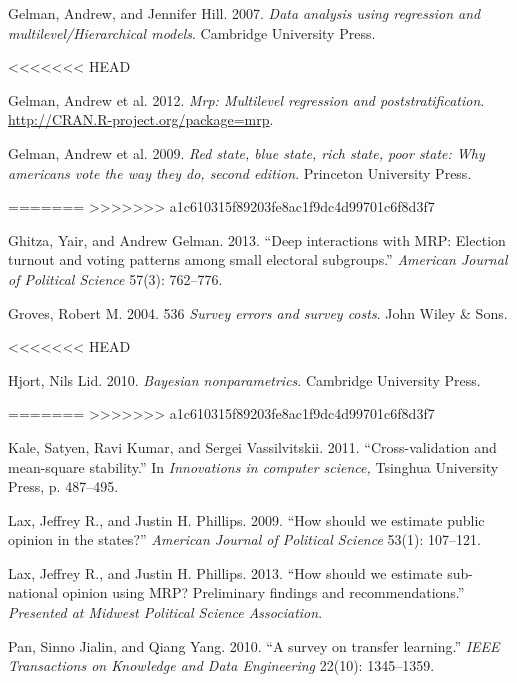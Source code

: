 \documentclass[11pt,article,oneside]{memoir}
\begin{document}
Gelman, Andrew, and Jennifer Hill. 2007. \emph{Data analysis using
regression and multilevel/Hierarchical models}. Cambridge University
Press.

<<<<<<< HEAD
Gelman, Andrew et al. 2012. \emph{Mrp: Multilevel regression and
poststratification}. \url{http://CRAN.R-project.org/package=mrp}.

Gelman, Andrew et al. 2009. \emph{Red state, blue state, rich state,
poor state: Why americans vote the way they do, second edition}.
Princeton University Press.

=======
>>>>>>> a1c610315f89203fe8ac1f9dc4d99701c6f8d3f7
Ghitza, Yair, and Andrew Gelman. 2013. ``Deep interactions with MRP:
Election turnout and voting patterns among small electoral subgroups.''
\emph{American Journal of Political Science} 57(3): 762--776.

Groves, Robert M. 2004. 536 \emph{Survey errors and survey costs}. John
Wiley \& Sons.

<<<<<<< HEAD
Hjort, Nils Lid. 2010. \emph{Bayesian nonparametrics}. Cambridge
University Press.

=======
>>>>>>> a1c610315f89203fe8ac1f9dc4d99701c6f8d3f7
Kale, Satyen, Ravi Kumar, and Sergei Vassilvitskii. 2011.
``Cross-validation and mean-square stability.'' In \emph{Innovations in
computer science,} Tsinghua University Press, p. 487--495.

Lax, Jeffrey R., and Justin H. Phillips. 2009. ``How should we estimate
public opinion in the states?'' \emph{American Journal of Political
Science} 53(1): 107--121.

Lax, Jeffrey R., and Justin H. Phillips. 2013. ``How should we estimate
sub-national opinion using MRP? Preliminary findings and
recommendations.'' \emph{Presented at Midwest Political Science
Association}.

Pan, Sinno Jialin, and Qiang Yang. 2010. ``A survey on transfer
learning.'' \emph{IEEE Transactions on Knowledge and Data Engineering}
22(10): 1345--1359.
\end{document}
